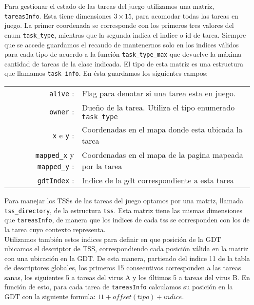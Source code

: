 \label{sec-tss-tareasInfo}
Para gestionar el estado de las tareas del juego utilizamos una matriz, \verb|tareasInfo|. Esta tiene dimensiones $3\times15$, para acomodar todas las tareas en juego. La primer coordenada se corresponde con los primeros tres valores del enum \verb|task_type|, mientras que la segunda indica el indice o id de tarea. 
Siempre que se accede guardamos el recaudo de mantenernos solo en los indices válidos para cada tipo de acuerdo a la función \verb|task_type_max| que devuelve la máxima cantidad de tareas de la clase indicada. 
El tipo de esta matriz es una estructura que llamamos \verb|task_info|.
En ésta guardamos los siguientes campos:\\


\begin{center}
	\begin{tabular}{r p{} }
		\verb|alive| : & Flag para denotar si una tarea esta en juego. \\
		\verb|owner| : & Dueño de la tarea. Utiliza el tipo enumerado \verb|task_type|\\
		\verb|x| e \verb|y| : & Coordenadas en el mapa donde esta ubicada la tarea\\
		\verb|mapped_x| y \verb|mapped_y| : & Coordenadas en el mapa de la pagina mapeada por la tarea\\
		\verb|gdtIndex| : & Indice de la gdt correspondiente a esta tarea\\
	\end{tabular}
\end{center}
\vspace{10pt}

Para manejar los TSSs de las tareas del juego optamos por una matriz, llamada \verb|tss_directory|, de la estructura \verb|tss|. Esta matriz tiene las mismas dimensiones que \verb|tareasInfo|, de manera que los indices de cada tss se corresponden con los de la tarea cuyo contexto representa. 
\\

Utilizamos también estos indices para definir en que posición de la GDT ubicamos el descriptor de TSS, correspondiendo cada posición válida en la matriz con una ubicación en la GDT. De esta manera, partiendo del indice 11 de la tabla de descriptores globales, los primeros 15 consecutivos corresponden a las tareas sanas, los siguientes 5 a tareas del virus A y los últimos 5 a tareas del virus B.
En función de esto, para cada tarea de \verb|tareasInfo| calculamos su posición en la GDT con la siguiente formula: $ 11 + offset(tipo) + indice$.\\

